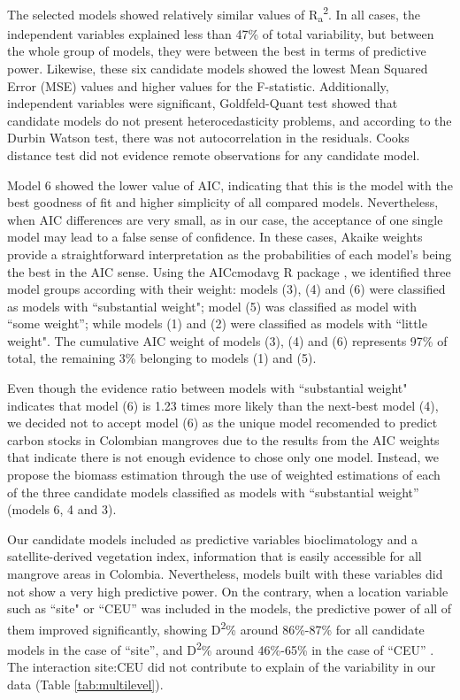 \documentclass[review, authoryear]{elsarticle}   	%
\begin{document}
The selected models showed relatively similar values of R\textsubscript{a}\textsuperscript{2}. In all cases, the independent variables explained less than 47\% of total variability, but between the whole group of models,  they were between the best in terms of predictive power. Likewise, these six candidate models showed the lowest Mean Squared Error (MSE) values and higher values for the F-statistic. Additionally, independent variables were significant, Goldfeld-Quant test showed that candidate models do not present heterocedasticity problems, and according to the Durbin Watson test, there was not autocorrelation in the residuals. Cooks distance test did not evidence remote observations for any candidate model. 

Model 6 showed the lower value of AIC, indicating that this is the model with the best goodness of fit and higher simplicity of all compared models. Nevertheless, when AIC differences are very small, as in our case, the acceptance of one single model may lead to a false sense of confidence. In these cases, Akaike weights provide a straightforward interpretation as the probabilities of each model's being the best in the AIC sense. Using the AICcmodavg R package \citep{Mazerolle:2015aa}, we identified three model groups according with their weight: models (3), (4) and (6) were classified as models with ``substantial weight"; model (5) was classified as model with ``some weight''; while models (1) and (2) were classified  as models with ``little weight". The cumulative AIC weight of models (3), (4) and (6) represents 97\% of total, the remaining 3\% belonging to models (1) and (5). 

Even though the evidence ratio between models with ``substantial weight" indicates that model (6) is 1.23 times more likely than  the next-best model (4), we decided not to accept model (6) as the unique model recomended to predict carbon stocks in Colombian mangroves due to  the results from the AIC weights that indicate there is not enough evidence to chose only one model. Instead, we propose the biomass estimation through the use of weighted estimations of each of the three candidate models classified as models with ``substantial weight'' (models 6, 4 and 3).

Our candidate models included as predictive variables bioclimatology and a satellite-derived vegetation index, information that is easily accessible for all mangrove areas in Colombia. Nevertheless, models built with these variables did not show a very high predictive power. On the contrary, when a location variable such as ``site" or ``CEU'' was included in the models, the predictive power of all of them improved significantly, showing D\textsuperscript{2}\% around 86\%-87\% for all candidate models in the case of ``site'', and D\textsuperscript{2}\% around 46\%-65\%  in the case of ``CEU'' . The interaction site:CEU  did not contribute to explain of the variability in our data (Table \ref{tab:multilevel}).
\end{document}

